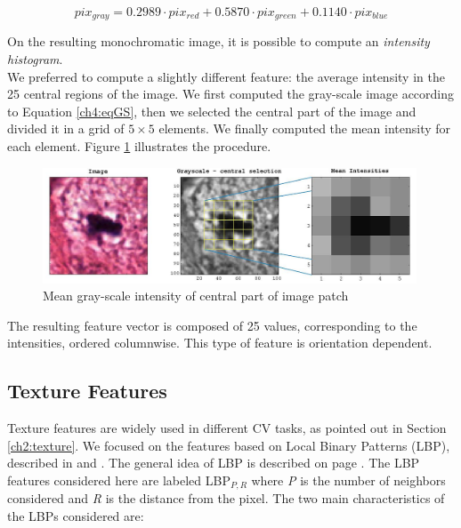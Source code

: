 \begin{equation}
 \label{ch4:eqGS}
 pix_{gray} = 0.2989 \cdot pix_{red} + 0.5870 \cdot pix_{green} + 0.1140 \cdot pix_{blue}
\end{equation}

On the resulting monochromatic image, it is possible to compute an \textit{intensity histogram}.\\
We preferred to compute a slightly different feature: the average intensity in the 25 central regions of the image.
We first computed the gray-scale image according to Equation \ref{ch4:eqGS}, then we selected the central part of the image and divided it in a grid of $5\times5$ elements.
We finally computed the mean intensity for each element. Figure \ref{ch4:fig3} illustrates the procedure.

\begin{figure}[!hbt]
  \centering
    \includegraphics[width=0.99\textwidth]{./images/GSintens1_mod1.png}
  \caption[Example of mean gray-scale intensities feature]{Mean gray-scale intensity of central part of image patch}
  \label{ch4:fig3}
\end{figure}

The resulting feature vector is composed of 25 values, corresponding to the intensities, ordered columnwise. This type of feature is orientation dependent.



\vspace{0.5cm}

\subsection{Texture Features}
\label{ch4:tf}

Texture features are widely used in different \Gls{CV} tasks, as pointed out in Section \ref{ch2:texture}. We focused on the features based on Local Binary Patterns (\Gls{LBP}),
described in \cite{LBP01} and \cite{LBP02}. The general idea of \Gls{LBP} is described on page \pageref{ch2:lbp}.
The \Gls{LBP} features considered here are labeled LBP$_{P,R}$ where \textit{P} is the number of neighbors considered and \textit{R} is the distance from the pixel.
The two main characteristics of the \Glspl{LBP} considered are:

